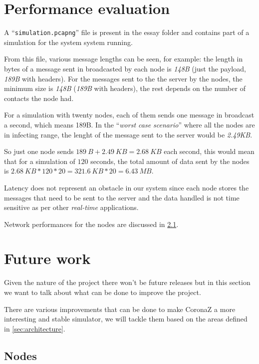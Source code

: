 \documentclass[conference]{IEEEtran}
\begin{document}
\section{Performance evaluation}\label{sec:performance}

	A ``\texttt{simulation.pcapng}'' file is present in the essay folder and contains part of a simulation for the system system running.

	From this file, various message lengths can be seen, for example: the length in bytes of a message sent in broadcasted by each node is \textit{148B} (just the payload, \textit{189B} with headers).
	For the messages sent to the the server by the nodes, the minimum size is \textit{148B} (\textit{189B} with headers), the rest depends on the number of contacts the node had.
	
	For a simulation with twenty nodes, each of them sends one message in broadcast a second, which means 189B.
	In the ``\textit{worst case scenario}'' where all the nodes are in infecting range, the lenght of the message sent to the server would be \textit{2.49KB}.
	
	So just one node sends $189~B + 2.49~KB = 2.68~KB$ each second, this would mean that for a simulation of $120$ seconds, the total amount of data sent by the nodes is $2.68~KB*120*20 = 321.6~KB*20 = 6.43~MB$.
	
	Latency does not represent an obstacle in our system since each node stores the messages that need to be sent to the server and the data handled is not time sensitive as per other \textit{real-time} applications.
	
	Network performances for the nodes are discussed in \ref{subsec:nodes_improvements}.

\section{Future work}\label{sec:future_work}

	Given the nature of the project there won't be future releases but in this section we want to talk about what can be done to improve the project.
	
	There are various improvements that can be done to make CoronaZ a more interesting and stable simulator, we will tackle them based on the areas defined in \ref{sec:architecture}.
	
	\subsection{Nodes}\label{subsec:nodes_improvements}
	
\end{document}
